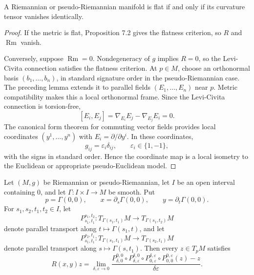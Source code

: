 \begin{theorem}
\label{thm:flatness-iff-zero-curvature}
A Riemannian or pseudo-Riemannian manifold is flat if and only if its curvature
tensor vanishes identically.
\end{theorem}

\begin{proof}
\sketch If the metric is flat, Proposition 7.2 gives the flatness criterion,
so $R$ and $\operatorname{Rm}$ vanish.

Conversely, suppose $\operatorname{Rm}=0$. Nondegeneracy of $g$ implies
$R=0$, so the Levi-Civita connection satisfies the flatness criterion. At
$p\in M$, choose an orthonormal basis $(b_1,\ldots,b_n)$, in standard signature
order in the pseudo-Riemannian case. The preceding lemma extends it to parallel
fields $(E_1,\ldots,E_n)$ near $p$. Metric compatibility makes this a local
orthonormal frame. Since the Levi-Civita connection is torsion-free,
\[
[E_i,E_j]=\nabla_{E_i}E_j-\nabla_{E_j}E_i=0.
\]
The canonical form theorem for commuting vector fields provides local
coordinates $(y^1,\ldots,y^n)$ with $E_i=\partial/\partial y^i$. In these
coordinates,
\[
g_{ij}=\varepsilon_i\delta_{ij},
\qquad \varepsilon_i\in\{1,-1\},
\]
with the signs in standard order. Hence the coordinate map is a local isometry
to the Euclidean or appropriate pseudo-Euclidean model.
\end{proof}

\begin{theorem}
\label{thm:curvature-endomorphism-formula}
Let $(M,g)$ be Riemannian or pseudo-Riemannian, let $I$ be an open interval
containing $0$, and let $\Gamma\colon I\times I\to M$ be smooth. Put
\[
p=\Gamma(0,0),
\qquad x=\partial_s\Gamma(0,0),
\qquad y=\partial_t\Gamma(0,0).
\]
For $s_1,s_2,t_1,t_2\in I$, let
\[
P_{s_1,t_1}^{s_1,t_2}
\colon T_{\Gamma(s_1,t_1)}M\longrightarrow T_{\Gamma(s_1,t_2)}M
\]
denote parallel transport along $t\mapsto\Gamma(s_1,t)$, and let
\[
P_{s_1,t_1}^{s_2,t_1}
\colon T_{\Gamma(s_1,t_1)}M\longrightarrow T_{\Gamma(s_2,t_1)}M
\]
denote parallel transport along $s\mapsto\Gamma(s,t_1)$. Then every
$z\in T_pM$ satisfies
\begin{equation}
R(x,y)z
=\lim_{\delta,\varepsilon\to0}
\frac{
P_{\delta,0}^{0,0}\circ
P_{\delta,\varepsilon}^{\delta,0}\circ
P_{0,\varepsilon}^{\delta,\varepsilon}\circ
P_{0,0}^{0,\varepsilon}(z)-z
}{\delta\varepsilon}. \tag{7.10}
\end{equation}
\end{theorem}


